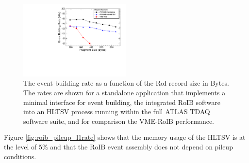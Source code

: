 \begin{figure}[t!]
\centering
\includegraphics[width=0.5\textwidth]{roib_summary_size} 
\caption{The event building rate as a function of the RoI record size in Bytes. The rates are shown for a standalone application that implements 
a minimal interface for event building, the integrated RoIB software into an HLTSV process
running within the full ATLAS TDAQ software suite, and for comparison the VME-RoIB performance.}
\label{fig:roib_summary}
\end{figure} 

Figure \ref{fig:roib_pileup_l1rate} shows that the memory usage of the HLTSV is at the level of 5\% and that the RoIB event assembly does not depend 
on pileup conditions.


